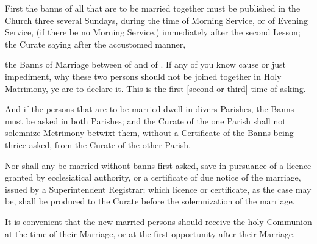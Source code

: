
\begin{rubric}
First the banns of all that are to be married together must be published in the Church three several Sundays, during the time of Morning Service, or of Evening Service, (if there be no Morning Service,) immediately after the second Lesson; the Curate saying after the accustomed manner,
\end{rubric}

 the Banns of Marriage between  of \changeable{---} and  of \changeable{---}. If any of you know cause or just impediment, why these two persons should not be joined together in Holy Matrimony, ye are to declare it.
This is the first [second or third] time of asking.

\begin{rubric}
And if the persons that are to be married dwell in divers Parishes, the Banns must be asked in both Parishes; and the Curate of the one Parish shall not solemnize Metrimony betwixt them, without a Certificate of the Banns being thrice asked, from the Curate of the other Parish.
\end{rubric}

\begin{leftbar}
\begin{rubric}
Nor shall any be married without banns first asked, save in pursuance of a licence granted by ecclesiatical authority, or a certificate of due notice of the marriage, issued by a Superintendent Registrar; which licence or certificate, as the case may be, shall be produced to the Curate before the solemnization of the marriage.
\end{rubric}
\end{leftbar}

\begin{rubric}
It is convenient that the new-married persons should receive the holy Communion at the time of their Marriage, or at the first opportunity after their Marriage.
\end{rubric}

